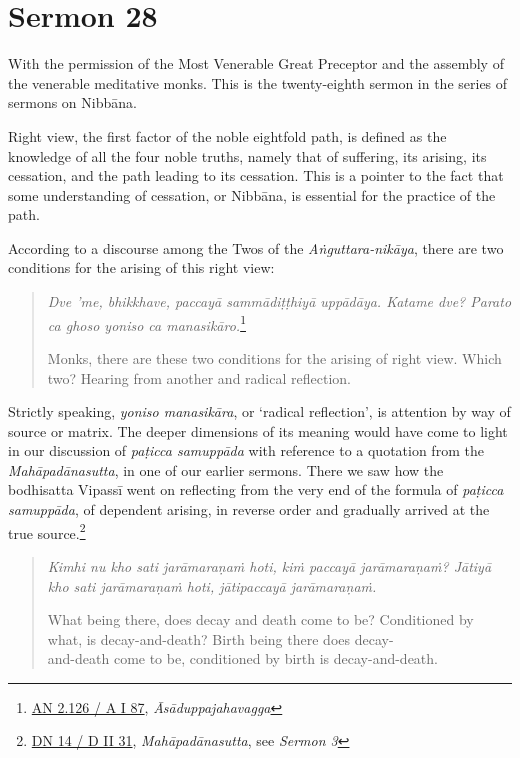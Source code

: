 \chapter{Sermon 28}

\NibbanaOpeningQuote

With the permission of the Most Venerable Great Preceptor and the assembly of the venerable meditative monks. This is the twenty-eighth sermon in the series of sermons on Nibbāna.

Right view, the first factor of the noble eightfold path, is defined as the knowledge of all the four noble truths, namely that of suffering, its arising, its cessation, and the path leading to its cessation. This is a pointer to the fact that some understanding of cessation, or Nibbāna, is essential for the practice of the path.

According to a discourse among the Twos of the \emph{Aṅguttara-nikāya}, there are two conditions for the arising of this right view:

\begin{quote}
\emph{Dve 'me, bhikkhave, paccayā sammādiṭṭhiyā uppādāya. Katame dve? Parato ca ghoso yoniso ca manasikāro.}\footnote{\href{https://suttacentral.net/an2.118-129/pli/ms}{AN 2.126 / A I 87}, \emph{Āsāduppajahavagga}}

Monks, there are these two conditions for the arising of right view. Which two? Hearing from another and radical reflection.
\end{quote}

Strictly speaking, \emph{yoniso manasikāra}, or `radical reflection', is attention by way of source or matrix. The deeper dimensions of its meaning would have come to light in our discussion of \emph{paṭicca samuppāda} with reference to a quotation from the \emph{Mahāpadānasutta}, in one of our earlier sermons. There we saw how the bodhisatta Vipassī went on reflecting from the very end of the formula of \emph{paṭicca samuppāda}, of dependent arising, in reverse order and gradually arrived at the true source.\footnote{\href{https://suttacentral.net/dn14/pli/ms}{DN 14 / D II 31}, \emph{Mahāpadānasutta}, see \emph{Sermon 3}}

\begin{quote}
\emph{Kimhi nu kho sati jarāmaraṇaṁ hoti, kiṁ paccayā jarāmaraṇaṁ? Jātiyā kho sati jarāmaraṇaṁ hoti, jātipaccayā jarāmaraṇaṁ.}

What being there, does decay and death come to be? Conditioned by what, is decay-and-death? Birth being there does decay-\\ and-death come to be, conditioned by birth is decay-and-death.
\end{quote}

